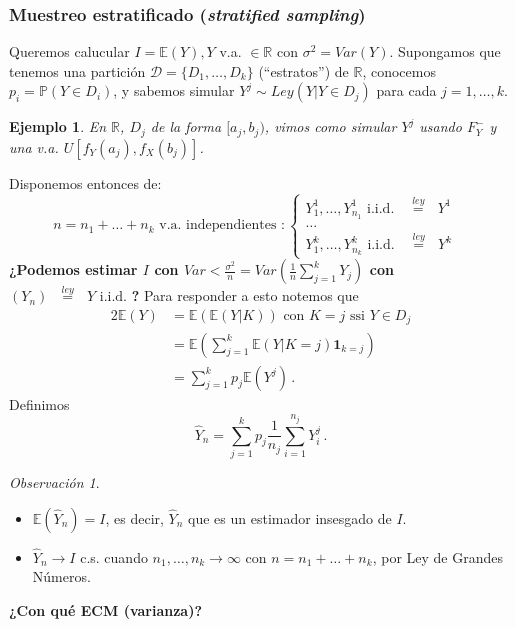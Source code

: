 \documentclass[letterpaper,11pt]{article} %
\theoremstyle{defbreak}
\newtheorem{example}{Ejemplo}[subsection]
\theoremstyle{propbreak}
\theoremstyle{remark}
\newtheorem{remark}{Observación}[subsection]
\theoremstyle{break}
\def\R{\mathbb{R}}
\def\E{\mathbb{E}}
\def\P{\mathbb{P}}
\def\var{Var}
\def\ejercicio{\color{blue}Ejercicio\color{black}}
\def\iid{\mbox{ i.i.d. }}
\def\beforeitemize{\leavevmode \vspace{-0.5\baselineskip}}
\def\gris{\color{mygray}}
\def\negro{\color{black}}
\def\igualley{\mbox{ }\overset{ley}{=}\mbox{ }}
\begin{document}
\subsubsection{Muestreo estratificado (\textit{stratified sampling})}
\label{estratificado}
Queremos calucular $I=\E(Y), Y$ v.a. $\in\R$ con $\sigma^2=\var(Y)$. 
\newline Supongamos que tenemos una partición $\mathcal{D}=\{D_1,\dots,D_k\}$ (``estratos'') de $\R$, conocemos \\ $p_i=\P(Y\in D_i)$, y sabemos simular $Y^j\sim Ley(Y | Y \in D_j)$ para cada $j=1,\dots,k$.
\begin{example}
En $\R$, $D_j$ de la forma $[a_j,b_j)$, vimos como simular $Y^j$ usando $F_Y^-$ y una v.a. $U[f_Y(a_j),f_X(b_j)]$.
\end{example}
Disponemos entonces de:
$$ n=n_1+\dots+n_k \mbox{ v.a. independientes }:\begin{cases}
Y^1_1,\dots,Y^1_{n_1} \iid \igualley Y^1 &\\
\dots & \\
Y^k_1,\dots,Y^k_{n_k} \iid \igualley Y^k &
\end{cases} $$
\textbf{¿Podemos estimar $I$ con $\var<\displaystyle\frac{\sigma^2}{n}=\var\left(\frac{1}{n}\sum^k_{j=1}Y_j\right)$ con $(Y_n)\igualley Y \iid$?}
Para responder a esto notemos que
\begin{alignat*}{2}
    \E(Y) & = \E(\E(Y|K)) \mbox{ con }K=j \mbox{ ssi }Y\in D_j\\
     & = \displaystyle\E(\sum^k_{j=1}\E(Y|K=j)\mathbf{1}_{k=j}) \\
     & = \displaystyle\sum^k_{j=1}p_j\E(Y^j) \, .
\end{alignat*}
Definimos
$$ \hat{Y}_n=\displaystyle\sum^k_{j=1}p_j\frac{1}{n_j}\sum^{n_j}_{i=1}Y^j_i \, .$$
\begin{remark}
\beforeitemize
\begin{itemize}
    \item $\E(\hat{Y}_n)=I$, es decir, $\hat{Y}_n$ que es un estimador insesgado de $I$.
    \item $\hat{Y}_n\to I$ c.s.  cuando  $n_1, \dots, n_k\to \infty $ con   $n=n_1+ \dots + n_k $, por Ley de Grandes N\'umeros. 
\end{itemize}
\end{remark}
\textbf{¿Con qué ECM (varianza)?}
\end{document}
